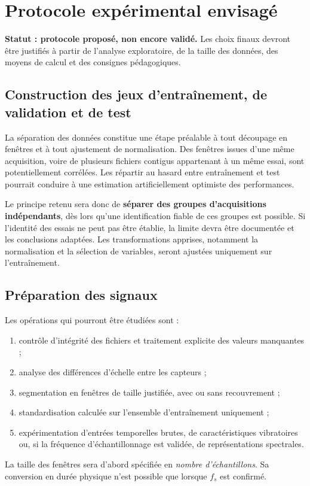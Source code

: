 \chapter{Protocole expérimental envisagé}
\label{chap:methodes}
\begin{encadreinfo}
\textbf{Statut : protocole proposé, non encore validé.} Les choix finaux devront être justifiés à partir de l'analyse exploratoire, de la taille des données, des moyens de calcul et des consignes pédagogiques.
\end{encadreinfo}

\section{Construction des jeux d'entraînement, de validation et de test}
La séparation des données constitue une étape préalable à tout découpage en fenêtres et à tout ajustement de normalisation. Des fenêtres issues d'une même acquisition, voire de plusieurs fichiers contigus appartenant à un même essai, sont potentiellement corrélées. Les répartir au hasard entre entraînement et test pourrait conduire à une estimation artificiellement optimiste des performances.

Le principe retenu sera donc de \textbf{séparer des groupes d'acquisitions indépendants}, dès lors qu'une identification fiable de ces groupes est possible. Si l'identité des essais ne peut pas être établie, la limite devra être documentée et les conclusions adaptées. Les transformations apprises, notamment la normalisation et la sélection de variables, seront ajustées uniquement sur l'entraînement.

\section{Préparation des signaux}
Les opérations qui pourront être étudiées sont :
\begin{enumerate}
  \item contrôle d'intégrité des fichiers et traitement explicite des valeurs manquantes ;
  \item analyse des différences d'échelle entre les capteurs ;
  \item segmentation en fenêtres de taille justifiée, avec ou sans recouvrement ;
  \item standardisation calculée sur l'ensemble d'entraînement uniquement ;
  \item expérimentation d'entrées temporelles brutes, de caractéristiques vibratoires ou, si la fréquence d'échantillonnage est validée, de représentations spectrales.
\end{enumerate}
La taille des fenêtres sera d'abord spécifiée en \emph{nombre d'échantillons}. Sa conversion en durée physique n'est possible que lorsque $f_s$ est confirmé.

